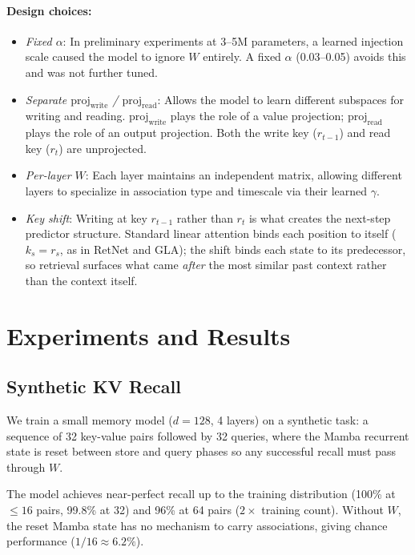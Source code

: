 \documentclass{article}
\begin{document}
\paragraph{Design choices:}
\begin{itemize}
    \item \textit{Fixed $\alpha$}: In preliminary experiments at 3--5M parameters, a learned injection scale caused the model to ignore $W$ entirely. A fixed $\alpha$ (0.03--0.05) avoids this and was not further tuned.
    \item \textit{Separate $\text{proj}_\text{write}$ / $\text{proj}_\text{read}$}: Allows the model to learn different subspaces for writing and reading. $\text{proj}_\text{write}$ plays the role of a value projection; $\text{proj}_\text{read}$ plays the role of an output projection. Both the write key ($r_{t-1}$) and read key ($r_t$) are unprojected.
    \item \textit{Per-layer $W$}: Each layer maintains an independent matrix, allowing different layers to specialize in association type and timescale via their learned $\gamma$.
    \item \textit{Key shift}: Writing at key $r_{t-1}$ rather than $r_t$ is what creates the next-step predictor structure. Standard linear attention binds each position to itself ($k_s = r_s$, as in RetNet and GLA); the shift binds each state to its predecessor, so retrieval surfaces what came \emph{after} the most similar past context rather than the context itself.
\end{itemize}

\section{Experiments and Results}

\FloatBarrier
\subsection{Synthetic KV Recall}
\label{sec:recall}

We train a small memory model ($d=128$, 4 layers) on a synthetic task: a sequence of 32 key-value pairs followed by 32 queries, where the Mamba recurrent state is reset between store and query phases so any successful recall must pass through $W$.

The model achieves near-perfect recall up to the training distribution (100\% at ${\leq}16$ pairs, 99.8\% at 32) and 96\% at 64 pairs ($2\times$ training count). Without $W$, the reset Mamba state has no mechanism to carry associations, giving chance performance ($1/16 \approx 6.2\%$).
\end{document}
